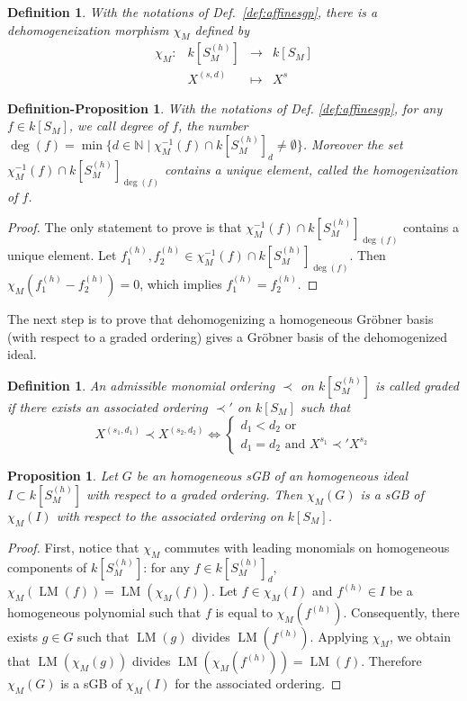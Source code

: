 \documentclass[12pt]{article}
\numberwithin{equation}{section}
\numberwithin{theorem}{section}
\newtheorem{defprop}[theorem]{Definition-Proposition}
\newtheorem{proposition}[theorem]{Proposition}
\newtheorem{definition}[theorem]{Definition}
\DeclareMathOperator{\LM}{LM}
\newcommand{\sgp}{S}
\newcommand{\N}{\mathbb{N}}
\begin{document}
\begin{definition}\label{def:dehom}
With the notations of Def.~\ref{def:affinesgp}, there is a \emph{dehomogeneization morphism} $\chi_M$ defined by
$$\begin{array}{rccc}
\chi_M:&k[\sgp_M^{(h)}]&\rightarrow&k[\sgp_M]\\
&X^{(s,d)}&\mapsto&X^{s}
\end{array}$$
\end{definition}

\begin{defprop}\label{def:hom}
With the notations of Def. \ref{def:affinesgp}, for any $f\in k[S_M]$, we call degree of $f$, the number $\deg(f)=\min \{d\in\N\mid \chi_M^{-1}(f)\cap k[S_M^{(h)}]_d\neq \emptyset\}$. Moreover the set $\chi_M^{-1}(f)\cap k[S_M^{(h)}]_{\deg(f)}$ contains a unique element, called the \emph{homogenization} of $f$.
\end{defprop}
\begin{proof}
The only statement to prove is that $\chi_M^{-1}(f)\cap k[S_M^{(h)}]_{\deg(f)}$ contains a unique element. Let $f_1^{(h)},f_2^{(h)}\in \chi_M^{-1}(f)\cap k[S_M^{(h)}]_{\deg(f)}$. Then $\chi_M(f_1^{(h)}-f_2^{(h)})=0$, which implies $f_1^{(h)}=f_2^{(h)}$.
\end{proof}

The next step is to prove that dehomogenizing a homogeneous Gr\"obner basis (with respect to a graded ordering) gives a Gr\"obner basis of the dehomogenized ideal.

\begin{definition}
An admissible monomial ordering $\prec$ on $k[\sgp_M^{(h)}]$
 is called \emph{graded} if there exists an associated ordering $\prec'$ on $k[\sgp_M]$ such that
$$
X^{(s_1,d_1)}\prec X^{(s_2,d_2)} \Leftrightarrow \left\{\begin{array}{c}d_1<d_2\text{ or}\\
d_1=d_2\text{ and } X^{s_1}\prec'X^{s_2}
 \end{array}\right.$$
\end{definition}
\begin{proposition}\label{prop:deshom}
Let $G$ be an homogeneous sGB of an homogeneous ideal $I\subset k[\sgp_M^{(h)}]$ with respect to a graded ordering. Then 
$\chi_M(G)$ is a sGB of $\chi_M(I)$ with respect to the associated ordering on $k[\sgp_M]$.
\end{proposition}

\begin{proof}
First, notice that $\chi_M$ commutes with leading monomials on homogeneous components of $k[\sgp_M^{(h)}]$: for any $f\in k[\sgp_M^{(h)}]_d$, $\chi_M(\LM(f))=\LM(\chi_M(f))$. Let $f\in\chi_M(I)$ and $f^{(h)}\in I$ be a homogeneous polynomial such that $f$ is equal to $\chi_M(f^{(h)})$. Consequently, there exists $g\in G$ such that $\LM(g)$ divides $\LM(f^{(h)})$. Applying $\chi_M$, we obtain that $\LM(\chi_M(g))$ divides $\LM(\chi_M(f^{(h)}))=\LM(f)$. Therefore $\chi_M(G)$ is a sGB of $\chi_M(I)$ for the associated ordering.
\end{proof}
\end{document}
